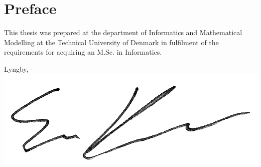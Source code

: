 \chapter{Preface}

This thesis was prepared at the department of Informatics and Mathematical
Modelling at the Technical University of Denmark in fulfilment of the
requirements for acquiring an M.Sc. in Informatics.
\vspace{20mm}
\begin{center}
    \hspace{20mm} Lyngby, \thesishandin-\thesisyear
    \vspace{5mm}
    \newline
    \includegraphics[scale=0.095]{figures/Signature}
\end{center}
\begin{flushright}
    \thesisauthor%
\end{flushright}
